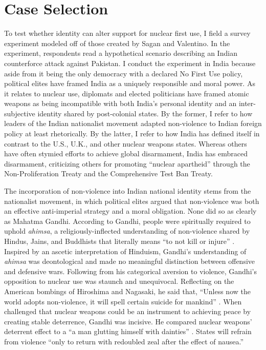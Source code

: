 \documentclass[12pt]{article}
\begin{document}
\section{Case Selection}
To test whether identity can alter support for nuclear first use, I field a survey experiment modeled off of those created by Sagan and Valentino. In the experiment, respondents read a hypothetical scenario describing an Indian counterforce attack against Pakistan. I conduct the experiment in India because aside from it being the only democracy with a declared No First Use policy, political elites have framed India as a uniquely responsible and moral power. As it relates to nuclear use, diplomats and elected politicians have framed atomic weapons as being incompatible with both India's personal identity and an inter-subjective identity shared by post-colonial states. By the former, I refer to how leaders of the Indian nationalist movement adapted non-violence to Indian foreign policy at least rhetorically. By the latter, I refer to how India has defined itself in contrast to the U.S., U.K., and other nuclear weapons states. Whereas others have often stymied efforts to achieve global disarmament, India has embraced disarmament, criticizing others for promoting “nuclear apartheid” through the Non-Proliferation Treaty and the Comprehensive Test Ban Treaty.

The incorporation of non-violence into Indian national identity stems from the nationalist movement, in which political elites argued that non-violence was both an effective anti-imperial strategy and a moral obligation. None did so as clearly as Mahatma Gandhi. According to Gandhi, people were spiritually required to uphold \textit{ahimsa}, a religiously-inflected understanding of non-violence shared by Hindus, Jains, and Buddhists that literally means “to not kill or injure” \citep{young_hinduism_2004}. Inspired by an ascetic interpretation of Hinduism, Gandhi's understanding of \textit{ahimsa} was deontological and made no meaningful distinction between offensive and defensive wars. Following from his categorical aversion to violence, Gandhi's opposition to nuclear use was staunch and unequivocal. Reflecting on the American bombings of Hiroshima and Nagasaki, he said that, “Unless now the world adopts non-violence, it will spell certain suicide for mankind” \citep[12]{mitra_moral_1987}. When challenged that nuclear weapons could be an instrument to achieving peace by creating stable deterrence, Gandhi was incisive. He compared nuclear weapons' deterrent effect to a “a man glutting himself with dainties” \citep[278]{gandhi_my_2025}. States will refrain from violence “only to return with redoubled zeal after the effect of nausea.”
\end{document}
